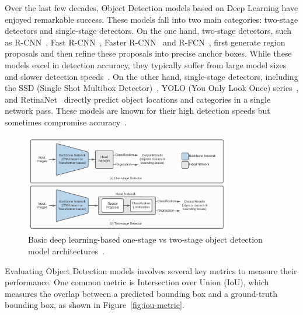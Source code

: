 \documentclass[12pt,oneside]{book} %
\begin{document}
Over the last few decades, Object Detection models based on Deep Learning have
enjoyed remarkable success. These models fall into two main categories:
two-stage detectors and single-stage detectors. On the one hand, two-stage
detectors, such as R-CNN~\cite{DBLP:journals/corr/GirshickDDM13}, Fast
R-CNN~\cite{DBLP:journals/corr/Girshick15}, Faster R-CNN~\cite{Ren2017} and
R-FCN~\cite{DBLP:journals/corr/DaiLHS16}, first generate region proposals and
then refine these proposals into precise anchor boxes. While these models excel
in detection accuracy, they typically suffer from large model sizes and slower
detection speeds~\cite{SurveyDLOD, ODNetworkUAVCNNTransformer}. On the other
hand, single-stage detectors, including the SSD (Single Shot Multibox
Detector)~\cite{DBLP:journals/corr/LiuAESR15}, YOLO (You Only Look Once)
series~\cite{DBLP:journals/corr/RedmonDGF15, DBLP:journals/corr/RedmonF16,
    DBLP:journals/corr/abs-2004-10934, chen2023yoloms,
    DBLP:journals/corr/abs-2107-08430, YOLOv5Release, li2023yolov6, YOLOv8,
    wang2024yolov9, xu2022ppyoloe, wang2023goldyolo, xu2023damoyolo,
    wang2024yolov10}, and RetinaNet~\cite{lin2018focal} directly predict object
locations and categories in a single network pass. These models are known for
their high detection speeds but sometimes compromise accuracy~\cite{SurveyDLOD,
    ODNetworkUAVCNNTransformer}.

\begin{figure}[H]
    \centering
    \includegraphics[width=0.8\textwidth]{figures/one-stage_two-stage_OD.png}
    \caption{Basic deep learning-based one-stage vs two-stage object detection model architectures~\cite{SurveyDLOD}.}\label{fig:two-stage-vs-single-stage}
\end{figure}

Evaluating Object Detection models involves several key metrics to measure
their performance. One common metric is Intersection over Union (IoU), which
measures the overlap between a predicted bounding box and a ground-truth
bounding box, as shown in Figure~\ref{fig:iou-metric}.
\end{document}
